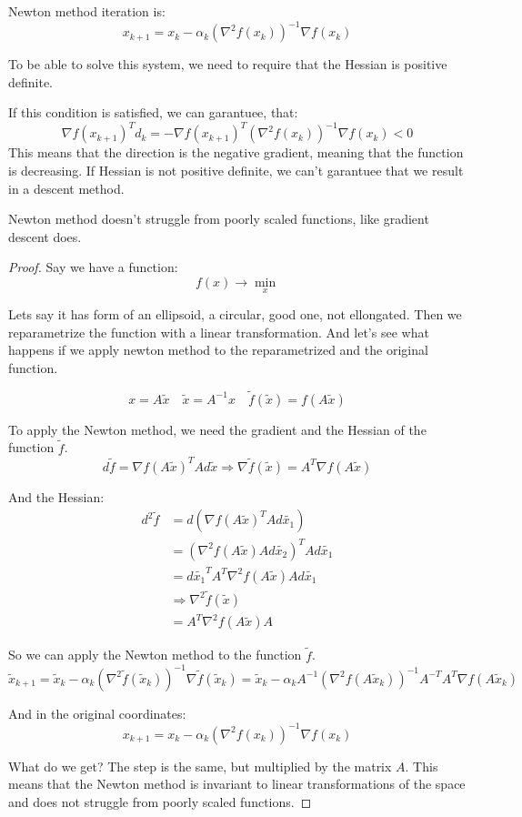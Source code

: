 Newton method iteration is: 
\[ 
    x_{k+1} = x_k - \alpha_k (\nabla^2 f(x_k))^{-1} \nabla f(x_k)
\]

To be able to solve this system, we need to require that the Hessian is positive definite. 

If this condition is satisfied, we can garantuee, that: 
\[
    \nabla f(x_{k+1})^T d_k = - \nabla f(x_{k+1})^T (\nabla^2 f(x_k))^{-1} \nabla f(x_k) < 0
\]
This means that the direction is the negative gradient, meaning that the function is decreasing. If Hessian is not positive definite, we can't garantuee that we result in a descent method. 

\begin{theorem}
    Newton method doesn't struggle from poorly scaled functions, like gradient descent does. 
\end{theorem}
\begin{proof}
    Say we have a function: 
    \[
        f(x) \to \min_x 
    \]

    Lets say it has form of an ellipsoid, a circular, good one, not ellongated. Then we reparametrize the function with a linear transformation. And let's see what happens if we apply newton method to the reparametrized and the original function.

    \[
        x = A \tilde{x} \quad \tilde{x} = A^{-1} x \quad \tilde{f} (\tilde{x}) = f(A \tilde{x}) 
    \]

    To apply the Newton method, we need the gradient and the Hessian of the function $\tilde{f}$.
    \[
        d \tilde{f} = \nabla f (A \tilde{x})^T A d \tilde{x} \Longrightarrow \nabla \tilde{f} (\tilde{x}) = A^T \nabla f (A \tilde{x})
    \]

    And the Hessian:
    \begin{align*}
        d^2 \tilde{f} &= d (\nabla f (A \tilde{x})^T A d \tilde{x_1}) \\ 
        &= (\nabla^2 f (A \tilde{x}) A d \tilde{x_2})^T A d \tilde{x_1} \\ 
        &= d \tilde{x_1}^T A^T \nabla^2 f (A \tilde{x}) A d \tilde{x_1} \\ 
        &\Longrightarrow \nabla^2 \tilde{f} (\tilde{x}) \\ 
        &= A^T \nabla^2 f (A \tilde{x}) A
    \end{align*}

    So we can apply the Newton method to the function $\tilde{f}$.
    \[
        \tilde{x}_{k+1} = \tilde{x}_k - \alpha_k (\nabla^2 \tilde{f} (\tilde{x}_k))^{-1} \nabla \tilde{f} (\tilde{x}_k) = \tilde{x}_k - \alpha_k A^{-1} (\nabla^2 f (A \tilde{x}_k))^{-1} A^{-T} A^{T} \nabla f (A \tilde{x}_k)
    \]

    And in the original coordinates: 
    \[ 
        x_{k+1} = x_k - \alpha_k (\nabla^2 f (x_k))^{-1} \nabla f (x_k)
    \]

    What do we get? The step is the same, but multiplied by the matrix $A$. This means that the Newton method is invariant to linear transformations of the space and does not struggle from poorly scaled functions.
\end{proof}

